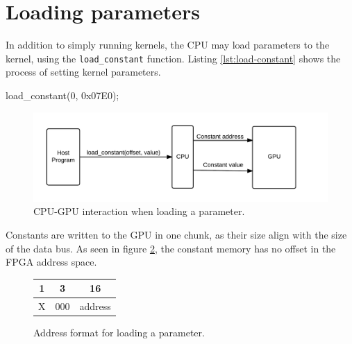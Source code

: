 \section{Loading parameters}
In addition to simply running kernels, the CPU may load parameters to the kernel, using the \verb/load_constant/ function.
Listing \ref{lst:load-constant} shows the process of setting kernel parameters.

\begin{c-code}[caption=Setting a kernel parameter, label=lst:load-constant]
load_constant(0, 0x07E0);
\end{c-code}

\begin{figure}[H]
    \centering
    \includegraphics[width=\textwidth]{../cpu/diagrams/loading_a_constant.png}
    \caption{CPU-GPU interaction when loading a parameter.}
    \label{fig:loading_a_constant}
\end{figure}

Constants are written to the GPU in one chunk, as their size align with the size of the data bus.
As seen in figure \ref{fig:load_constant_format}, the constant memory has no offset in the FPGA address space.

\begin{figure}[H]
    \centering
    \begin{tabular}{|c|c|c|}
    \multicolumn{1}{c}{1} & \multicolumn{1}{c}{3} & \multicolumn{1}{c}{16} \\ \hline
    X & 000 & address \\ \hline
    \end{tabular}
    \caption{Address format for loading a parameter.}
    \label{fig:load_constant_format}
\end{figure}
